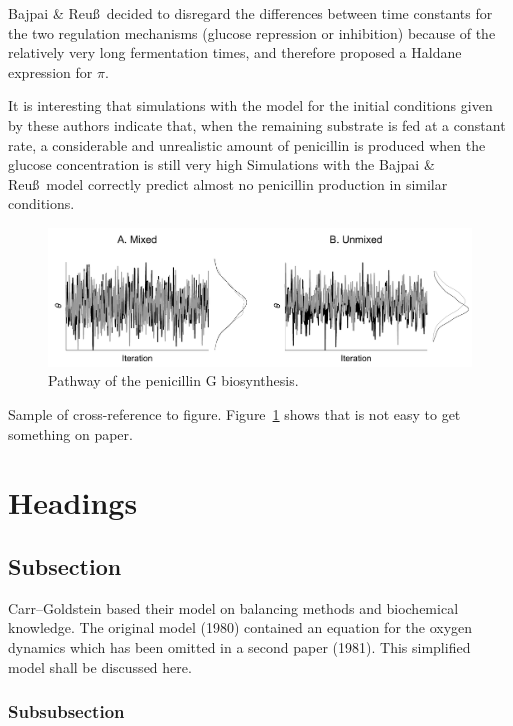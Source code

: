 \documentclass[ba]{imsart}
\numberwithin{equation}{section}
\theoremstyle{plain}
\begin{document}
Bajpai \& Reu\ss\ decided to disregard the differences between time
constants for the two regulation mechanisms (glucose repression or
inhibition) because of the relatively very long fermentation times,
and therefore proposed a Haldane expression for $\pi$.

It is interesting that simulations with the \cite{hilbe} model for the
initial conditions given by these authors indicate that, when the
remaining substrate is fed at a constant rate, a considerable and
unrealistic amount of penicillin is produced when the glucose
concentration is still very high \cite{dyke,greene,hilbe} Simulations
with the Bajpai \& Reu\ss\ model correctly predict almost no
penicillin production in similar conditions.

\begin{figure} 
\includegraphics{unmixed_1.pdf}
\caption[]{Pathway of the penicillin G biosynthesis.}
\label{penG}
\end{figure}

Sample of cross-reference to figure.
Figure~\ref{penG} shows that is not easy to get something on paper.



\section{Headings}

\subsection{Subsection}

Carr--Goldstein based their model on balancing methods and biochemical
know\-ledge. The original model (1980) contained an equation for the
oxygen dynamics which has been omitted in a second paper (1981). This
simplified model shall be discussed here.

\subsubsection{Subsubsection}
\end{document}
